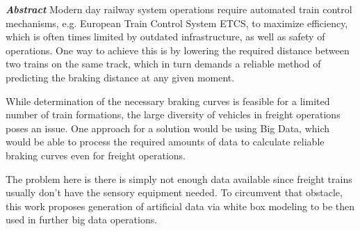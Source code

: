 \clearpage

\par\noindent
\textit{\textbf{Abstract}} Modern day railway system operations require automated train control mechanisms, e.g. European Train Control System ETCS, to maximize efficiency, which is often times limited by outdated infrastructure, as well as safety of operations. One way to achieve this is by lowering the required distance between two trains on the same track, which in turn demands a reliable method of predicting the braking distance at any given moment. 
\par
While determination of the necessary braking curves is feasible for a limited number of train formations, the large diversity of vehicles in freight operations poses an issue. One approach for a solution would be using Big Data, which would be able to process the required amounts of data to calculate reliable braking curves even for freight operations. 
\par
The problem here is there is simply not enough data available since freight trains usually don't have the sensory equipment needed. To circumvent that obstacle, this work proposes generation of artificial data via white box modeling to be then used in further big data operations.
